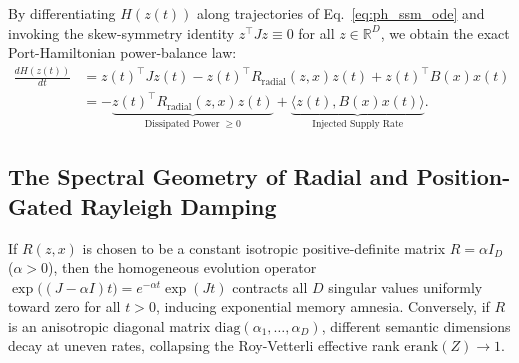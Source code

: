 \documentclass[11pt,a4paper]{article}
\begin{document}
\begin{sloppypar}
By differentiating $H(z(t))$ along trajectories of Eq.~\eqref{eq:ph_ssm_ode} and invoking the skew-symmetry identity $z^\top J z \equiv 0$ for all $z \in \mathbb{R}^D$, we obtain the exact Port-Hamiltonian power-balance law:
\begin{align}
    \frac{dH(z(t))}{dt} &= z(t)^\top J z(t) - z(t)^\top R_{\text{radial}}(z, x) z(t) + z(t)^\top B(x) x(t) \nonumber \\
    &= -\underbrace{z(t)^\top R_{\text{radial}}(z, x) z(t)}_{\text{Dissipated Power } \ge 0} + \underbrace{\langle z(t), B(x)x(t) \rangle}_{\text{Injected Supply Rate}}.
    \label{eq:passivity_balance}
\end{align}
\end{sloppypar}

\subsection{The Spectral Geometry of Radial and Position-Gated Rayleigh Damping}
If $R(z, x)$ is chosen to be a constant isotropic positive-definite matrix $R = \alpha I_D$ ($\alpha > 0$), then the homogeneous evolution operator $\exp\big((J - \alpha I)t\big) = e^{-\alpha t}\exp(Jt)$ contracts all $D$ singular values uniformly toward zero for all $t > 0$, inducing exponential memory amnesia. Conversely, if $R$ is an anisotropic diagonal matrix $\mathrm{diag}(\alpha_1,\dots,\alpha_D)$, different semantic dimensions decay at uneven rates, collapsing the Roy-Vetterli effective rank $\mathrm{erank}(Z) \to 1$.
\end{document}
